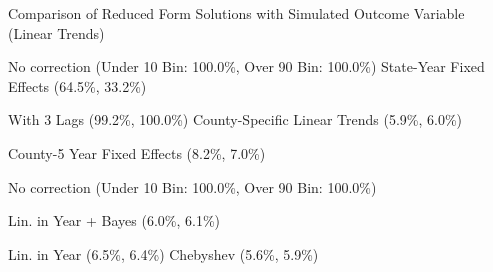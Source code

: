 \caption{Comparison of Reduced Form Solutions with Simulated Outcome Variable (Linear Trends) \label{fig:distributions-existing-solutions}}
\caption*{\color{p1line}{\textbf{\textemdash\textemdash}} No correction (Under 10 Bin: 100.0\%, Over 90 Bin: 100.0\%) \hspace{1cm} \color{p2line}{- - -} State-Year Fixed Effects (64.5\%, 33.2\%)}
\caption*{\color{p3line}{\textbf{- - -}} With 3 Lags (99.2\%, 100.0\%) \hspace{1cm} \color{p4line}{\textbf{- - -}} County-Specific Linear Trends (5.9\%, 6.0\%)}
\caption*{\color{p5line}{\textbf{- - -}} County-5 Year Fixed Effects (8.2\%, 7.0\%)}


\caption*{\color{p1line}{\textbf{\textemdash\textemdash}} No correction (Under 10 Bin: 100.0\%, Over 90 Bin: 100.0\%)}
\caption*{\color{p2line}{\textbf{- - -}} Lin. in Year + Bayes (6.0\%, 6.1\%)}
\caption*{\color{p3line}{\textbf{- - -}} Lin. in Year (6.5\%, 6.4\%) \hspace{1cm} \color{p4line}{\textbf{- - -}} Chebyshev (5.6\%, 5.9\%)}